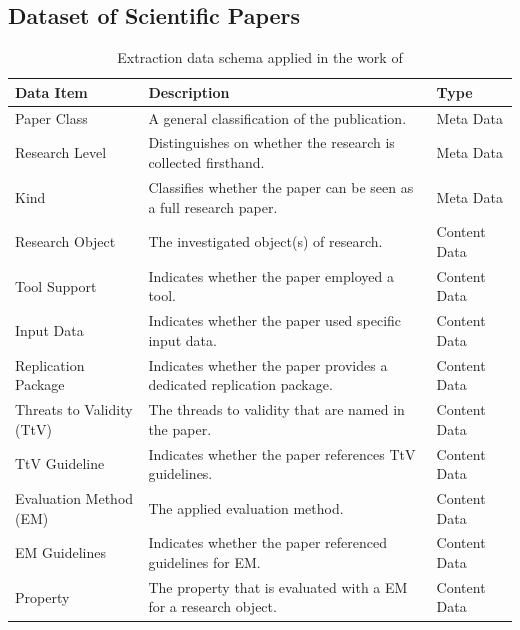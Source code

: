 \subsection{Dataset of Scientific Papers}
\label{sec:experiments_dataset}

\begin{table}[t]
    \centering
    \begin{tabularx}{\textwidth}{l X l}   
        \toprule
        \textbf{Data Item} & \textbf{Description} & \textbf{Type}\\
        \midrule
            Paper Class & A general classification of the publication. & Meta Data \\
        \cmidrule(l){1-3}
            Research Level & Distinguishes on whether the research is collected firsthand. & Meta Data \\
        \cmidrule(l){1-3}
            Kind & Classifies whether the paper can be seen as a full research paper. & Meta Data \\
        \cmidrule(l){1-3}
            Research Object & The investigated object(s) of research. & Content Data \\
        \cmidrule(l){1-3}
            Tool Support & Indicates whether the paper employed a tool. & Content Data \\
        \cmidrule(l){1-3}
            Input Data & Indicates whether the paper used specific input data. & Content Data \\
        \cmidrule(l){1-3}
            Replication Package & Indicates whether the paper provides a dedicated replication package. & Content Data \\
        \cmidrule(l){1-3}
            Threats to Validity (TtV) & The threads to validity that are named in the paper. & Content Data \\
        \cmidrule(l){1-3}
            TtV Guideline & Indicates whether the paper references TtV guidelines. & Content Data \\
        \cmidrule(l){1-3}
            Evaluation Method (EM) & The applied evaluation method. & Content Data \\
        \cmidrule(l){1-3}
            EM Guidelines & Indicates whether the paper referenced guidelines for EM. & Content Data \\
        \cmidrule(l){1-3}
            Property & The property that is evaluated with a EM for a research object. & Content Data \\
        \bottomrule
    \end{tabularx}
    \caption[Data Schema for SWA Publications]{Extraction data schema applied in the work of \textcite{konersmann_evaluation_2022}}
    \label{tab:swa_data_schema}
\end{table}

